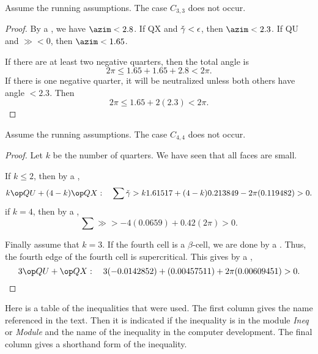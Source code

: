 \begin{lemma}
Assume the running assumptions.  The case $C_{3,3}$ does not occur.
\end{lemma}

\begin{proof} By a , we have
$\azim < 2.8$. If QX and $\check\gamma<\epsilon$, then $\azim < 2.3$.  If QU and $\gg <0$, then $\azim < 1.65$.

If there are at least two negative quarters, then the total angle is
\[
2\pi \le 1.65 + 1.65 + 2.8 < 2\pi.
\]
If there is one negative quarter, it will be neutralized unless both others have angle $< 2.3$.  Then
\[
2\pi \le 1.65 + 2 (2.3) < 2\pi.
\]
\end{proof}

\begin{lemma}
Assume the running assumptions. 
The case $C_{4,4}$ does not occur.
\end{lemma}

\begin{proof} Let $k$ be the number of quarters.  We have seen that all faces are small.

If $k\le 2$, then by a ,
\[
k\QU + (4-k)\QX:\quad \sum\gg > k 1.61517 + (4-k) 0.213849 - 2\pi (0.119482) > 0.
\]
if $k=4$, then by a ,
\[
\sum \gg > -4 (0.0659) + 0.42 (2\pi) > 0.
\]

Finally assume that $k=3$.  If the fourth cell is a $\beta$-cell, we are done by
a .  Thus, the fourth edge of the fourth cell is supercritical.  This gives by a ,
\[
3\QU + \QX:\quad 3(-0.0142852) + (0.00457511) + 2\pi (0.00609451) > 0.
\]
\end{proof}


Here is a table of the inequalities that were used.  The first column gives
the name referenced in the text.  Then it is indicated if the inequality
is in the module {\it Ineq} or {\it Module} and the name of the inequality
in the computer development. The final column gives a shorthand form of the
inequality.

